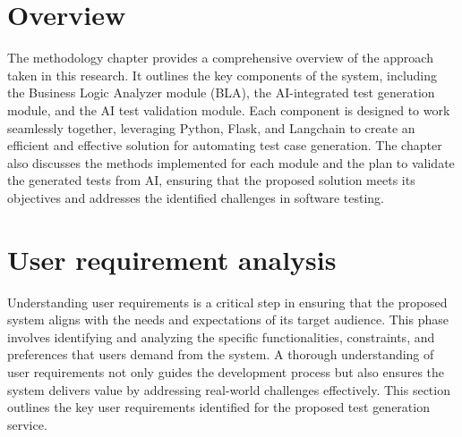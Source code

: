 

\section{Overview}

\hspace{0.5cm}The methodology chapter provides a comprehensive overview of the approach taken in this research. It outlines the key components of the system, including the Business Logic Analyzer module (BLA), the AI-integrated test generation module, and the AI test validation module. Each component is designed to work seamlessly together, leveraging Python, Flask, and Langchain to create an efficient and effective solution for automating test case generation. The chapter also discusses the methods implemented for each module and the plan to validate the generated tests from AI, ensuring that the proposed solution meets its objectives and addresses the identified challenges in software testing.
\section{User requirement analysis}

\hspace{0.5cm}Understanding user requirements is a critical step in ensuring that the proposed system aligns with the needs and expectations of its target audience. This phase involves identifying and analyzing the specific functionalities, constraints, and preferences that users demand from the system. A thorough understanding of user requirements not only guides the development process but also ensures the system delivers value by addressing real-world challenges effectively. This section outlines the key user requirements identified for the proposed test generation service.

